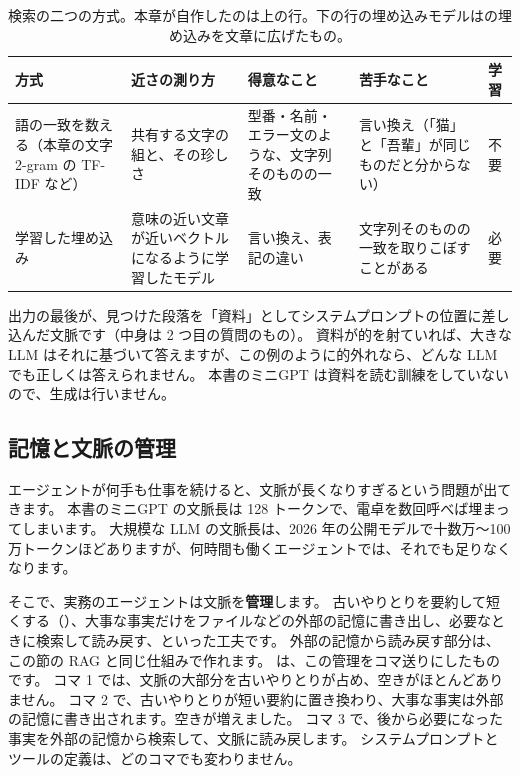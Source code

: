 \begin{table}[tbp]
\centering
\caption{検索の二つの方式。本章が自作したのは上の行。下の行の埋め込みモデルはの埋め込みを文章に広げたもの。}
\label{tab:agent-search}
\footnotesize
\setlength{\tabcolsep}{3pt}
\begin{tabular}{@{}>{\raggedright\arraybackslash}p{22mm}>{\raggedright\arraybackslash}p{28mm}>{\raggedright\arraybackslash}p{30mm}>{\raggedright\arraybackslash}p{30mm}>{\raggedright\arraybackslash}p{8mm}@{}}
\toprule
方式 & 近さの測り方 & 得意なこと & 苦手なこと & 学習 \\
\midrule
語の一致を数える（本章の文字 2-gram の TF-IDF など） & 共有する文字の組と、その珍しさ & 型番・名前・エラー文のような、文字列そのものの一致 & 言い換え（「猫」と「吾輩」が同じものだと分からない） & 不要 \\
学習した埋め込み & 意味の近い文章が近いベクトルになるように学習したモデル & 言い換え、表記の違い & 文字列そのものの一致を取りこぼすことがある & 必要 \\
\bottomrule
\end{tabular}
\end{table}

出力の最後が、見つけた段落を「資料」としてシステムプロンプトの位置に差し込んだ文脈です（中身は 2 つ目の質問のもの）。
資料が的を射ていれば、大きな LLM はそれに基づいて答えますが、この例のように的外れなら、どんな LLM でも正しくは答えられません。
本書のミニGPT は資料を読む訓練をしていないので、生成は行いません。

\subsection{記憶と文脈の管理}

エージェントが何手も仕事を続けると、文脈が長くなりすぎるという問題が出てきます。
本書のミニGPT の文脈長は 128 トークンで、電卓を数回呼べば埋まってしまいます。
大規模な LLM の文脈長は、2026 年の公開モデルで十数万〜100 万トークンほどありますが、何時間も働くエージェントでは、それでも足りなくなります。

そこで、実務のエージェントは文脈を\textbf{管理}します。
古いやりとりを要約して短くする（）、大事な事実だけをファイルなどの外部の記憶に書き出し、必要なときに検索して読み戻す、といった工夫です。
外部の記憶から読み戻す部分は、この節の RAG と同じ仕組みで作れます。
は、この管理をコマ送りにしたものです。
コマ 1 では、文脈の大部分を古いやりとりが占め、空きがほとんどありません。
コマ 2 で、古いやりとりが短い要約に置き換わり、大事な事実は外部の記憶に書き出されます。空きが増えました。
コマ 3 で、後から必要になった事実を外部の記憶から検索して、文脈に読み戻します。
システムプロンプトとツールの定義は、どのコマでも変わりません。

